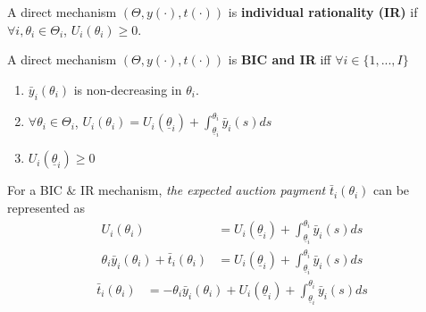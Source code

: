 \documentclass[11pt]{elegantbook}
\begin{document}
\begin{definition}
    \normalfont
    A direct mechanism $\left(\Theta,y(\cdot),t(\cdot)\right)$ is \textbf{individual rationality (IR)} if $\forall i,\theta_i\in\Theta_i$, $U_i(\theta_i)\geq 0$.
\end{definition}

\begin{corollary}
    A direct mechanism $\left(\Theta,y(\cdot),t(\cdot)\right)$ is \textbf{BIC and IR} iff $\forall i\in\{1,...,I\}$
    \begin{enumerate}[(1).]
        \item $\bar{y}_i(\theta_i)$ is non-decreasing in $\theta_i$.
        \item $\forall \theta_i\in\Theta_i$, $U_i(\theta_i)=U_i(\underline{\theta}_i)+\int_{\underline{\theta}_i}^{\theta_i}\bar{y}_i(s)ds$
        \item $U_i(\underline{\theta}_i)\geq 0$
    \end{enumerate}
\end{corollary}
For a BIC $\&$ IR mechanism, \textit{the expected auction payment} $\bar{t}_i(\theta_i)$ can be represented as
\begin{equation}
    \begin{aligned}
        U_i(\theta_i)&=U_i(\underline{\theta}_i)+\int_{\underline{\theta}_i}^{\theta_i}\bar{y}_i(s)ds\\
        \theta_i \bar{y}_i(\theta_i)+\bar{t}_i(\theta_i)&=U_i(\underline{\theta}_i)+\int_{\underline{\theta}_i}^{\theta_i}\bar{y}_i(s)ds
    \end{aligned}
    \nonumber
\end{equation}
\begin{equation}
    \begin{aligned}
        \bar{t}_i(\theta_i)&=-\theta_i \bar{y}_i(\theta_i)+U_i(\underline{\theta}_i)+\int_{\underline{\theta}_i}^{\theta_i}\bar{y}_i(s)ds
    \end{aligned}
    \label{t_star}
\end{equation}
\end{document}
